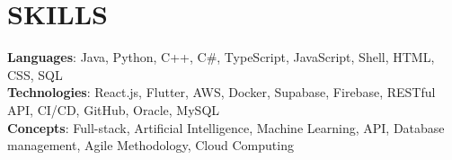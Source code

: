 \section{SKILLS}
\begin{itemize}[leftmargin=0.15in, label={}]
	\small{\item{
	      \textbf{Languages}{: Java, Python, C++, C\#, TypeScript, JavaScript, Shell, HTML, CSS, SQL} \\
	      \textbf{Technologies}{: React.js, Flutter, AWS, Docker, Supabase, Firebase, RESTful API, CI/CD, GitHub, Oracle, MySQL} \\
	      \textbf{Concepts}{: Full-stack, Artificial Intelligence, Machine Learning, API, Database management, Agile Methodology, Cloud Computing}
	      }}
\end{itemize}